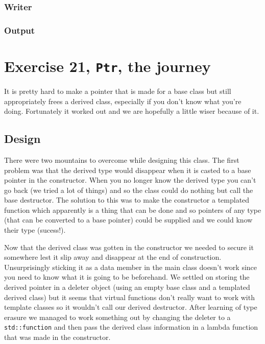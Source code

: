 \documentclass[11pt]{article}
\begin{document}
\subsubsection*{Writer}





\subsubsection*{Output}


\section*{Exercise 21, \texttt{Ptr}, the journey}
It is pretty hard to make a pointer that is made for a base class but still appropriately frees a derived class, especially if you don't know what you're doing. Fortunately it worked out and we are hopefully a little wiser because of it.

\subsection*{Design}
There were two mountains to overcome while designing this class.
The first problem was that the derived type would disappear when it is casted to a base pointer in the constructor.
When you no longer know the derived type you can't go back (we tried a lot of things) and so the class could do nothing but call the base destructor.
The solution to this was to make the constructor a templated function which apparently is a thing that can be done and so pointers of any type (that can be converted to a base pointer) could be supplied and we could know their type (sucess!).

Now that the derived class was gotten in the constructor we needed to secure it somewhere lest it slip away and disappear at the end of construction.
Unsurprisingly sticking it as a data member in the main class doesn't work since you need to know what it is going to be beforehand.
We settled on storing the derived pointer in a deleter object (using an empty base class and a templated derived class) but it seems that virtual functions don't really want to work with template classes so it wouldn't call our derived destructor.
After learning of type erasure we managed to work something out by changing the deleter to a \texttt{std::function} and then pass the derived class information in a lambda function that was made in the constructor.
\end{document}
